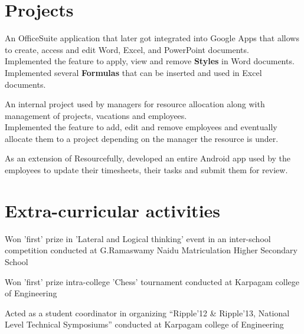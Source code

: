 \documentclass[a4paper]{srika-resume} %
\begin{document}
\begin{minipage}[t]{0.64\textwidth}

\section{Projects}


An OfficeSuite application that later got integrated into Google Apps that allows to
create, access and edit Word, Excel, and PowerPoint documents.\\
Implemented the feature to apply, view and remove \textbf{Styles} in Word documents. \\
Implemented several \textbf{Formulas} that can be inserted and used in Excel documents.

\sectionspace %



An internal project used by managers for resource allocation along with management of projects, vacations and employees.  \\
Implemented the feature to add, edit and remove employees and eventually allocate them to a project depending on the manager the resource is under.

\sectionspace %



As an extension of Resourcefully, developed an entire Android app used by the employees to update their timesheets, their tasks and submit them for review. 

\sectionspace %


\section{Extra-curricular activities} 
\begin{tightitemizespaced}
\item Won 'first' prize in 'Lateral and Logical thinking' event in an inter-school competition conducted at G.Ramaswamy Naidu Matriculation Higher Secondary School
\item Won 'first' prize intra-college 'Chess' tournament conducted at Karpagam college of Engineering
\item Acted as a student coordinator in organizing “Ripple'12 \& Ripple'13, National Level Technical Symposiums” conducted at Karpagam college of Engineering
\end{tightitemizespaced}


\end{minipage}
\end{document}
